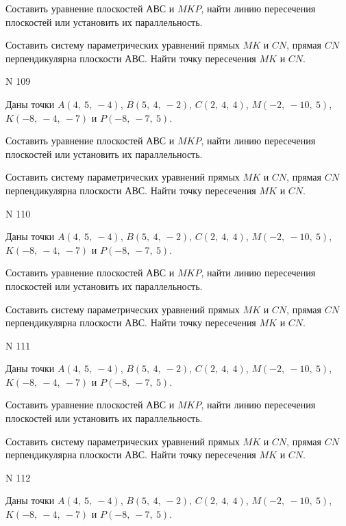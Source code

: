 \documentclass[11pt]{report}
\begin{document}
Составить уравнение плоскостей $АВС$ и $MKP$,
найти линию пересечения плоскостей или установить их параллельность.

Составить систему параметрических уравнений прямых $MK$ и $CN$,
прямая $CN$ перпендикулярна плоскости $АВС$. 
Найти точку пересечения $MK$ и $CN$.



 N 109

Даны точки $A\left( 4, \  5, \  -4\right)$, $B\left( 5, \  4, \  -2\right)$, $C\left( 2, \  4, \  4\right)$, $M\left( -2, \  -10, \  5\right)$, $K\left( -8, \  -4, \  -7\right)$ и $P\left( -8, \  -7, \  5\right)$.


Составить уравнение плоскостей $АВС$ и $MKP$,
найти линию пересечения плоскостей или установить их параллельность.

Составить систему параметрических уравнений прямых $MK$ и $CN$,
прямая $CN$ перпендикулярна плоскости $АВС$. 
Найти точку пересечения $MK$ и $CN$.



 N 110

Даны точки $A\left( 4, \  5, \  -4\right)$, $B\left( 5, \  4, \  -2\right)$, $C\left( 2, \  4, \  4\right)$, $M\left( -2, \  -10, \  5\right)$, $K\left( -8, \  -4, \  -7\right)$ и $P\left( -8, \  -7, \  5\right)$.


Составить уравнение плоскостей $АВС$ и $MKP$,
найти линию пересечения плоскостей или установить их параллельность.

Составить систему параметрических уравнений прямых $MK$ и $CN$,
прямая $CN$ перпендикулярна плоскости $АВС$. 
Найти точку пересечения $MK$ и $CN$.



 N 111

Даны точки $A\left( 4, \  5, \  -4\right)$, $B\left( 5, \  4, \  -2\right)$, $C\left( 2, \  4, \  4\right)$, $M\left( -2, \  -10, \  5\right)$, $K\left( -8, \  -4, \  -7\right)$ и $P\left( -8, \  -7, \  5\right)$.


Составить уравнение плоскостей $АВС$ и $MKP$,
найти линию пересечения плоскостей или установить их параллельность.

Составить систему параметрических уравнений прямых $MK$ и $CN$,
прямая $CN$ перпендикулярна плоскости $АВС$. 
Найти точку пересечения $MK$ и $CN$.



 N 112

Даны точки $A\left( 4, \  5, \  -4\right)$, $B\left( 5, \  4, \  -2\right)$, $C\left( 2, \  4, \  4\right)$, $M\left( -2, \  -10, \  5\right)$, $K\left( -8, \  -4, \  -7\right)$ и $P\left( -8, \  -7, \  5\right)$.
\end{document}
